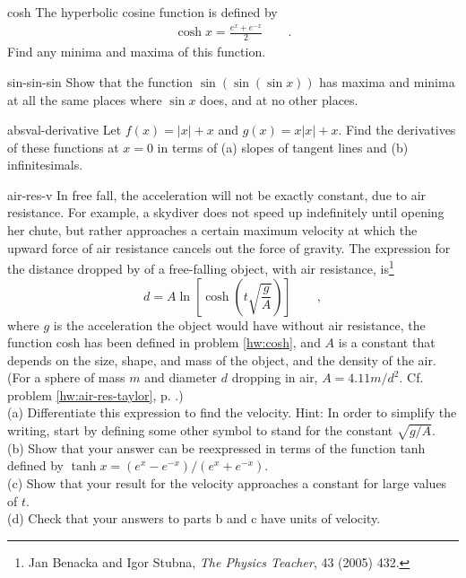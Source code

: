 \begin{hwsection}
\begin{hwwithsoln}{cosh}
The hyperbolic cosine function is defined by
\begin{align*}
  \cosh x = \frac{e^x+e^{-x}}{2} \qquad .
\end{align*}
Find any minima and maxima of this function.
\end{hwwithsoln}

\begin{hwwithsoln}{sin-sin-sin}
Show that the function $\sin(\sin(\sin x))$ has maxima and minima at all the same places
where $\sin x$ does, and at no other places.
\end{hwwithsoln}

\begin{hwwithsoln}{absval-derivative}
Let $f(x)=|x|+x$ and $g(x)=x|x|+x$. Find the derivatives of these functions at $x=0$ in terms of
(a) slopes of tangent lines and (b) infinitesimals.
\end{hwwithsoln}

\begin{hwwithsoln}{air-res-v}
In free fall, the acceleration will not be exactly constant, due to air resistance. For example,
a skydiver does not speed up indefinitely until opening her chute, but rather approaches a certain
maximum velocity at which the upward force of air resistance cancels out the force of gravity.
The expression for the distance dropped by of a free-falling object, with air resistance, is\footnote{Jan Benacka
and Igor Stubna, \emph{The Physics Teacher}, 43 (2005) 432.}
\begin{equation*}
  d = A \ln\left[\cosh\left(t\sqrt{\frac{g}{A}}\right)\right] \qquad ,
\end{equation*}
where $g$ is the acceleration the object would have without air resistance, the function cosh
has been defined in problem \ref{hw:cosh}, and
$A$ is a constant that depends on the size, shape, and mass of the object, and the density of
the air. (For a sphere of mass $m$ and diameter $d$ dropping in air, $A=4.11m/d^2$.
Cf. problem \ref{hw:air-res-taylor}, p. \pageref{hw:air-res-taylor}.)\\
(a) Differentiate this expression to find the velocity.  Hint: In order to simplify the writing,
start by defining some other symbol to stand for the constant $\sqrt{g/A}$.\\
(b) Show that your answer can be reexpressed in terms of the function tanh defined by
$\tanh x=(e^x-e^{-x})/(e^x+e^{-x})$.\\
(c) Show that your result for the velocity approaches
a constant for large values of $t$.\\
(d) Check that your answers to parts b and c have units of velocity.
\end{hwwithsoln}


\end{hwsection}
